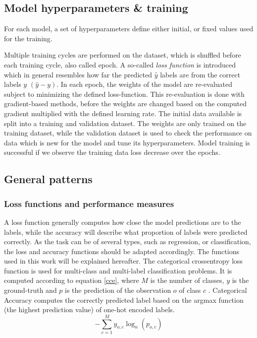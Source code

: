 
\subsection{Model hyperparameters \& training}
For each model, a set of hyperparameters define either initial, or fixed values used for the training. 

Multiple training cycles are performed on the dataset, which is shuffled before each training cycle, also called epoch. A so-called \emph{loss function} is introduced which in general resembles how far the predicted $\hat{y}$ labels are from the correct labels $y$ $(\hat{y} - y)$.
In each epoch, the weights of the model are re-evaluated subject to minimizing the defined loss-function. This re-evaluation is done with gradient-based methods, before the weights are changed based on the computed gradient multiplied with the defined learning rate. The initial data available is split into a training and validation dataset. The weights are only trained on the training dataset, while the validation dataset is used to check the performance on data which is new for the model and tune its hyperparameters. Model training is successful if we observe the training data loss decrease over the epochs. 


\subsection{General patterns}
\subsubsection{Loss functions and performance measures}
 A loss function generally computes how close the model predictions are to the labels, while the accuracy will describe what proportion of labels were predicted correctly. As the task can be of several types, such as regression, or classification, the loss and accuracy functions should be adapted accordingly. The functions used in this work will be explained hereafter.
The categorical crossentropy loss function is used for multi-class and multi-label classification problems. It is computed according to equation \ref{cce}, where $M$ is the number of classes, $y$ is the ground-truth and $p$ is the prediction of the observation $o$ of class $c$ \cite{noauthor_classical_nodate}. 
Categorical Accuracy computes the correctly predicted label based on the argmax function (the highest prediction value) of one-hot encoded labels.
\begin{equation}
\label{cce}
-\sum_{c=1}^My_{o,c}\log_{n}(p_{o,c})
\end{equation}

